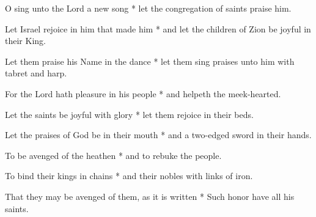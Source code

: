 \begin{multicols}{2}
	
	O sing unto the Lord a new song * let the congregation of saints praise him.
	
	Let Israel rejoice in him that made him * and let the children of Zion be joyful in their King.
	
	Let them praise his Name in the dance * let them sing praises unto him with tabret and harp.
	
	For the Lord hath pleasure in his people * and helpeth the meek-hearted.
	
	Let the saints be joyful with glory * let them rejoice in their beds.
	
	Let the praises of God be in their mouth * and a two-edged sword in their hands.
	
	To be avenged of the heathen * and to rebuke the people.
	
	To bind their kings in chains * and their nobles with links of iron.
	
	That they may be avenged of them, as it is written * Such honor have all his saints.
	
	\gloria{}
\end{multicols}